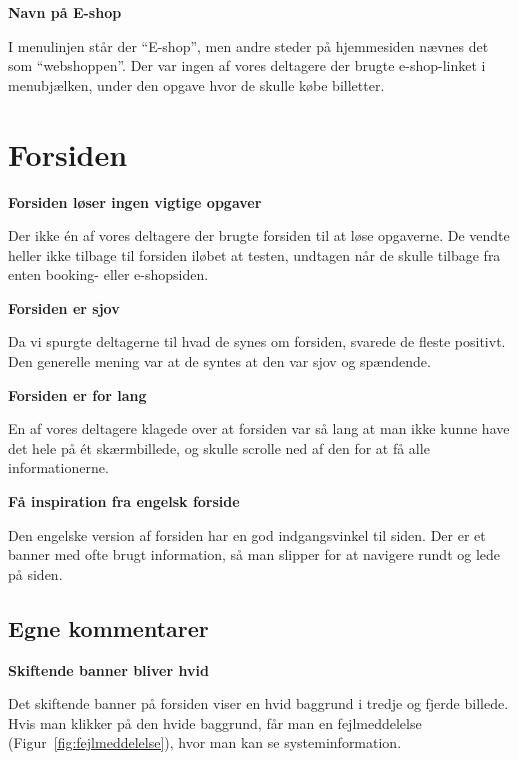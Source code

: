 \documentclass[10pt,a4paper]{article}      %
\newcommand\pic[1]{\texttt{[image: Pics/\#1]}}
\renewcommand\good{\pic{good}}
\renewcommand\goodidea{\pic{goodidea}}
\renewcommand\smallproblem{\pic{smallproblem}}
\renewcommand\seriousproblem{\pic{seriousproblem}}
\begin{document}
\begin{kommentarer}
\item[\smallproblem]{\textbf{Navn på E-shop}}

I menulinjen står der ``E-shop'', men andre steder på hjemmesiden nævnes det som
``webshoppen''. Der var ingen af vores deltagere der brugte e-shop-linket i
menubjælken, under den opgave hvor de skulle købe billetter.
\end{kommentarer}

\section{Forsiden}

\begin{kommentarer}
\item[\seriousproblem]{\textbf{Forsiden løser ingen vigtige opgaver}}

Der ikke én af vores deltagere der brugte forsiden til at løse opgaverne. De
vendte heller ikke tilbage til forsiden iløbet at testen, undtagen når de skulle
tilbage fra enten booking- eller e-shopsiden.

\item[\good]{\textbf{Forsiden er sjov}}

Da vi spurgte deltagerne til hvad de synes om forsiden, svarede de fleste
positivt. Den generelle mening var at de syntes at den var sjov og spændende.

\item[\smallproblem]{\textbf{Forsiden er for lang}}

En af vores deltagere klagede over at forsiden var så lang at man ikke kunne
have det hele på ét skærmbillede, og skulle scrolle ned af den for at få alle
informationerne.

\item[\goodidea]{\textbf{Få inspiration fra engelsk forside}}

Den engelske version af forsiden har en god indgangsvinkel til siden. Der er et
banner med ofte brugt information, så man slipper for at navigere rundt og lede
på siden.
\end{kommentarer}

\subsection{Egne kommentarer} %
\label{sub:Egne kommentarer forsiden}

\begin{kommentarer}
  \item[\seriousproblem]{\textbf{Skiftende banner bliver hvid}}

  Det skiftende banner på forsiden viser en hvid baggrund i tredje og fjerde
  billede. Hvis man klikker på den hvide baggrund, får man en fejlmeddelelse (Figur~\ref{fig:fejlmeddelelse}), hvor man kan se systeminformation.
\end{kommentarer}
\end{document}
